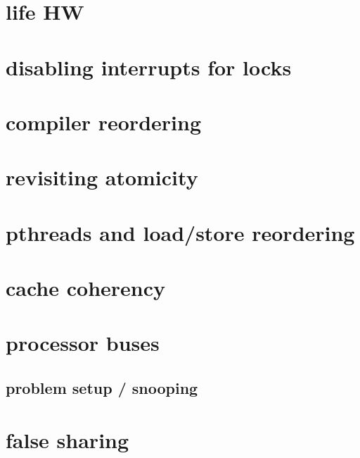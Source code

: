 \section{life HW}


\section{disabling interrupts for locks}


%

\section{compiler reordering}


\section{revisiting atomicity}


\section{pthreads and load/store reordering}




\section{cache coherency}
\section{processor buses}


\subsection{problem setup / snooping}


\section{false sharing}


